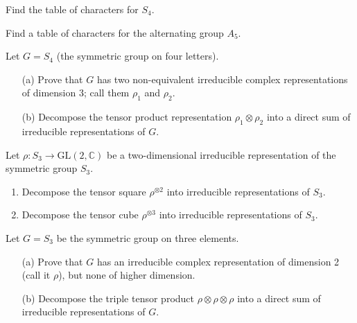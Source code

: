 \begin{prob}[S2014-Q5]
    Find the table of characters for $S_4$.
\end{prob}

\begin{prob}[F2016-Q6]
    Find a table of characters for the alternating group $A_5$.
\end{prob}


\begin{prob}[F2015-Q3]
    Let \( G = S_4 \) (the symmetric group on four letters).

\begin{enumerate}
    \item[(a)] Prove that \( G \) has two non-equivalent irreducible complex representations of dimension 3; call them \( \rho_1 \) and \( \rho_2 \).
    
    \item[(b)] Decompose the tensor product representation \( \rho_1 \otimes \rho_2 \) into a direct sum of irreducible representations of \( G \).
\end{enumerate}
\end{prob}


\begin{prob}[F2011-Q4]
    Let \(\rho \colon S_3 \to \mathrm{GL}(2, \mathbb{C})\) be a two-dimensional irreducible representation of the symmetric group \(S_3\). 

\begin{enumerate}
    \item Decompose the tensor square \(\rho^{\otimes 2}\) into irreducible representations of \(S_3\).
    \item Decompose the tensor cube \(\rho^{\otimes 3}\) into irreducible representations of \(S_3\).
\end{enumerate}
\end{prob}

\begin{prob}[F2014-Q3]
    Let \( G = S_3 \) be the symmetric group on three elements.

\begin{enumerate}
    \item[(a)] Prove that \( G \) has an irreducible complex representation of dimension 2 (call it \( \rho \)), but none of higher dimension.
    
    \item[(b)] Decompose the triple tensor product \( \rho \otimes \rho \otimes \rho \) into a direct sum of irreducible representations of \( G \).
\end{enumerate}
\end{prob}

